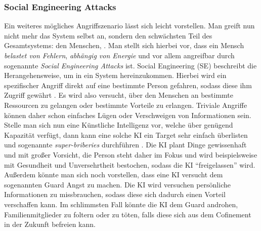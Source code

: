         \subsubsection{Social Engineering Attacks}\label{section:sea}
        Ein weiteres mögliches Angriffszenario lässt sich leicht vorstellen. Man greift nun nicht mehr das System selbst
        an, sondern den schwächsten Teil des Gesamtsystems: den Menschen\cite{armstrongforthcoming}, \cite{yampolskiy2012leakproofing}.
        Man stellt sich hierbei vor, dass ein Mensch \textit{belastet von Fehlern}, \textit{abhängig von Energie}
        und vor allem angreifbar durch sogenannte \textit{Social Engineering Attacks} ist. Social Engineering (SE)
        beschreibt die Herangehensweise, um in ein System hereinzukommen. Hierbei wird ein spezifischer Angriff direkt
        auf eine bestimmte Person gefahren, sodass diese ihm Zugriff gewährt \cite[s. 198]{yampolskiy2012leakproofing}. Es wird
        also versucht, über den Menschen an bestimmte Ressourcen zu gelangen oder bestimmte Vorteile zu erlangen. Triviale
        Angriffe können daher schon einfaches Lügen oder Verschweigen von Informationen sein.
        Stelle man sich nun eine Künstliche Intelligenz vor, welche über genügend Kapazität verfügt, dann kann eine solche
        KI ein Target sehr einfach überlisten und sogenannte \textit{super-briberies} durchführen \cite{yampolskiy2012leakproofing}.
        Die KI plant Dinge gewissenhaft und mit großer Vorsicht, die Person steht daher im Fokus und wird beispielsweise
        mit Gesundheit und Unversehrtheit bestochen, sodass die KI ``freigelassen'' wird. Außerdem könnte man sich noch
        vorstellen, dass eine KI versucht dem sogenannten Guard Angst zu machen. Die KI wird versuchen persönliche
        Informationen zu missbrauchen, sodass diese sich dadurch einen Vorteil verschaffen kann. Im schlimmsten Fall
        könnte die KI dem Guard androhen, Familienmitglieder zu foltern oder zu töten, falls diese sich aus dem Cofinement
        in der Zukunft befreien kann.

